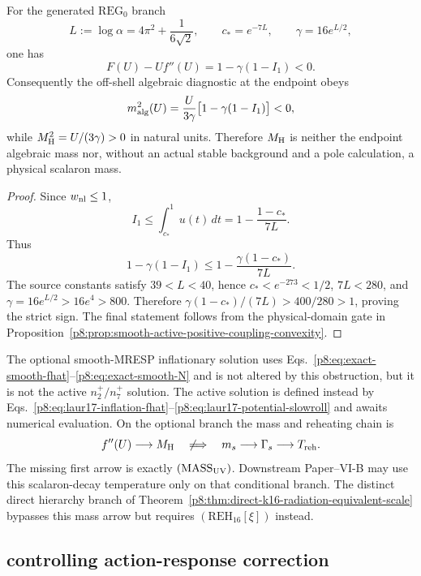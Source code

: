 \documentclass[12pt,a4paper]{article}
\begin{document}
\begin{proposition}
\label{p8:prop:uv-endpoint-negative-algebraic-mass}
For the generated \(\mathrm{REG}_0\) branch
\[
 L:=\log\alpha=4\pi^2+\frac1{6\sqrt2},
 \qquad c_*=e^{-7L},
 \qquad \gamma=16e^{L/2},
\]
one has
\[
 F(U)-Uf''(U)=1-\gamma(1-I_1)<0.
\]
Consequently the off-shell algebraic diagnostic at the endpoint obeys
\[
 m_{\rm alg}^2(U)
 =\frac{U}{3\gamma}\bigl[1-\gamma(1-I_1)\bigr]<0,
\]
while \(M_{\rm H}^2=U/(3\gamma)>0\) in natural units.  Therefore
\(M_{\rm H}\) is neither the endpoint algebraic mass nor, without an actual
stable background and a pole calculation, a physical scalaron mass.
\end{proposition}

\begin{proof}
Since \(w_{\rm nl}\le1\),
\[
 I_1\le\int_{c_*}^{1}u(t)\,dt
 =1-\frac{1-c_*}{7L}.
\]
Thus
\[
 1-\gamma(1-I_1)
 \le 1-\frac{\gamma(1-c_*)}{7L}.
\]
The source constants satisfy \(39<L<40\), hence
\(c_*<e^{-273}<1/2\), \(7L<280\), and
\(\gamma=16e^{L/2}>16e^4>800\).  Therefore
\(\gamma(1-c_*)/(7L)>400/280>1\), proving the strict sign.  The final
statement follows from the physical-domain gate in
Proposition~\ref{p8:prop:smooth-active-positive-coupling-convexity}.
\end{proof}

\begin{remark}
The optional smooth-MRESP inflationary solution uses
Eqs.~\eqref{p8:eq:exact-smooth-fhat}--\eqref{p8:eq:exact-smooth-N} and is not
altered by this obstruction, but it is not the active \(n_2^+/n_7^+\) solution.
The active solution is defined instead by
Eqs.~\eqref{p8:eq:laur17-inflation-fhat}--\eqref{p8:eq:laur17-potential-slowroll}
and awaits numerical evaluation.  On the optional branch the mass and
reheating chain is
\[
 f''(U)\longrightarrow M_{\rm H}
 \quad\not\Longrightarrow\quad
 m_s
 \longrightarrow\Gamma_s\longrightarrow T_{\rm reh}.
\]
The missing first arrow is exactly \((\mathrm{MASS}_{\rm UV})\).  Downstream
Paper--VI-B may use this scalaron-decay temperature only on that conditional
branch.  The distinct direct hierarchy branch of
Theorem~\ref{p8:thm:direct-k16-radiation-equivalent-scale} bypasses this mass
arrow but requires \((\mathrm{REH}_{16}[\xi])\) instead.
\end{remark}

\subsection{controlling action-response correction}
\label{p8:sec:v164-controlling-action-response}
\end{document}

